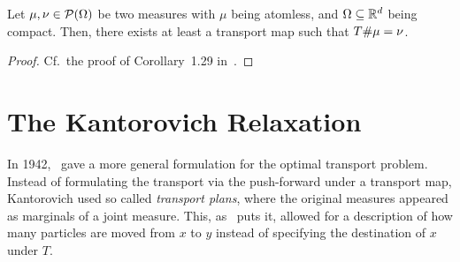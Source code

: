 
\begin{theorem}\label{NDTransMapExist}
	Let $\mu, \nu \in \mathcal{P}(\Omega)$ be two measures with $\mu$ being atomless, and $\Omega \subseteq \mathbb{R}^d$ being compact. Then, there exists at least a transport map \map[T]{\Omega}{\Omega} such that ${T} \# \mu = \nu$.
\end{theorem}

\begin{proof}
	Cf.\ the proof of Corollary~1.29 in\ \cite{San2015}.
\end{proof}



\section{The Kantorovich Relaxation}\label{KantRelax}
In 1942,\ \cite{Kan1942} gave a more general formulation for the optimal transport problem. Instead of formulating the transport via the push-forward under a transport map, Kantorovich used so called \textit{transport plans}, where the original measures appeared as marginals of a joint measure. This, as~\cite{San2015} puts it,  allowed for a description of how many particles are moved from $x$ to $y$ instead of specifying the destination of $x$ under $T$.

